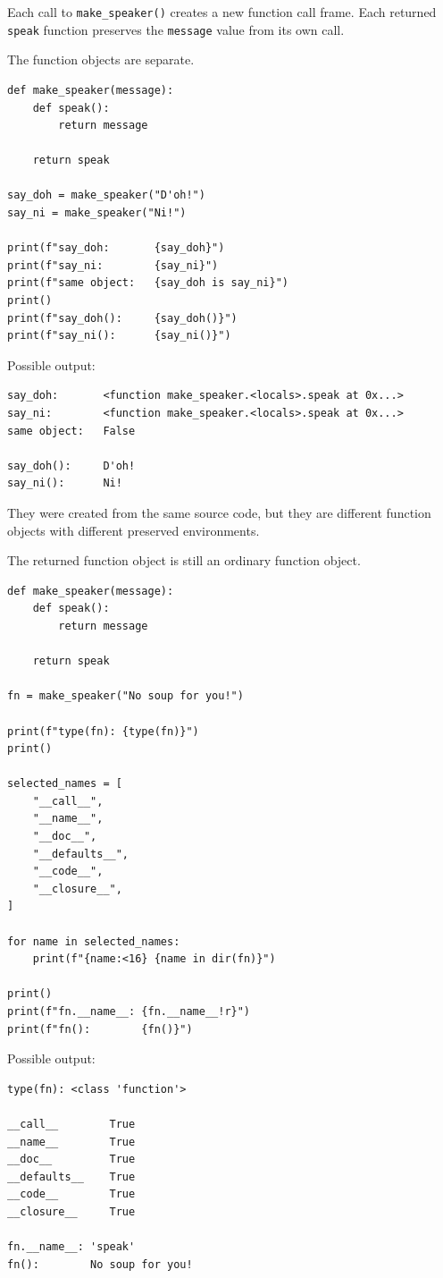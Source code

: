 Each call to \texttt{make\_speaker()} creates a new function call frame. Each returned \texttt{speak} function preserves the \texttt{message} value from its own call.

The function objects are separate.

\begin{verbatim}
def make_speaker(message):
    def speak():
        return message

    return speak

say_doh = make_speaker("D'oh!")
say_ni = make_speaker("Ni!")

print(f"say_doh:       {say_doh}")
print(f"say_ni:        {say_ni}")
print(f"same object:   {say_doh is say_ni}")
print()
print(f"say_doh():     {say_doh()}")
print(f"say_ni():      {say_ni()}")
\end{verbatim}

Possible output:

\begin{verbatim}
say_doh:       <function make_speaker.<locals>.speak at 0x...>
say_ni:        <function make_speaker.<locals>.speak at 0x...>
same object:   False

say_doh():     D'oh!
say_ni():      Ni!
\end{verbatim}

They were created from the same source code, but they are different function objects with different preserved environments.

The returned function object is still an ordinary function object.

\begin{verbatim}
def make_speaker(message):
    def speak():
        return message

    return speak

fn = make_speaker("No soup for you!")

print(f"type(fn): {type(fn)}")
print()

selected_names = [
    "__call__",
    "__name__",
    "__doc__",
    "__defaults__",
    "__code__",
    "__closure__",
]

for name in selected_names:
    print(f"{name:<16} {name in dir(fn)}")

print()
print(f"fn.__name__: {fn.__name__!r}")
print(f"fn():        {fn()}")
\end{verbatim}

Possible output:

\begin{verbatim}
type(fn): <class 'function'>

__call__        True
__name__        True
__doc__         True
__defaults__    True
__code__        True
__closure__     True

fn.__name__: 'speak'
fn():        No soup for you!
\end{verbatim}

